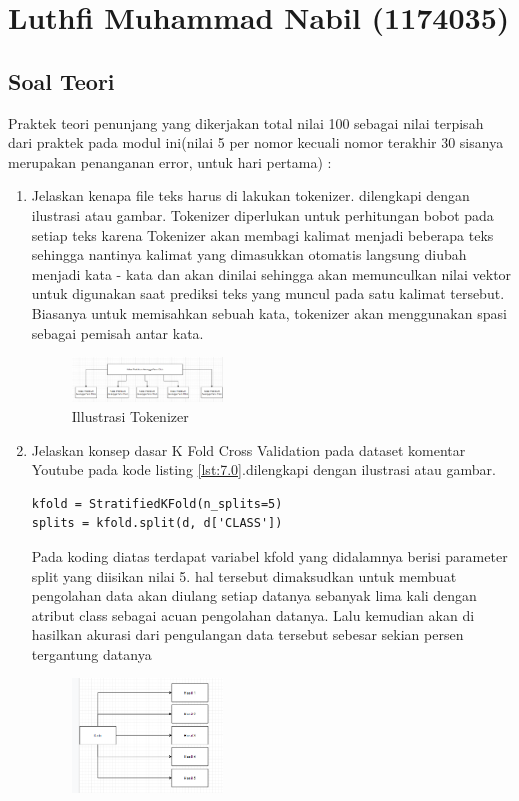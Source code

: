 \section{Luthfi Muhammad Nabil (1174035)}

\subsection{Soal Teori}
Praktek teori penunjang yang dikerjakan total nilai 100 sebagai nilai terpisah dari praktek pada modul ini(nilai 5 per nomor kecuali nomor terakhir 30 sisanya merupakan penanganan error, untuk hari pertama) :
\begin{enumerate}
\item
Jelaskan kenapa file teks harus di lakukan tokenizer. dilengkapi dengan ilustrasi atau gambar. \hfill \break
Tokenizer diperlukan untuk perhitungan bobot pada setiap teks karena Tokenizer akan membagi kalimat menjadi beberapa teks sehingga nantinya kalimat yang dimasukkan otomatis langsung diubah menjadi kata - kata dan akan dinilai sehingga akan memunculkan nilai vektor untuk digunakan saat prediksi teks yang muncul pada satu kalimat tersebut. Biasanya untuk memisahkan sebuah kata, tokenizer akan menggunakan spasi sebagai pemisah antar kata.
\begin{figure}[H]
    \includegraphics[width=4cm]{figures/1174035/chapter7/teori_1.png}
    \centering
    \caption{Illustrasi Tokenizer}
\end{figure}
\item
Jelaskan konsep dasar K Fold Cross Validation pada dataset komentar Youtube pada kode listing \ref{lst:7.0}.dilengkapi dengan ilustrasi atau gambar.
\begin{lstlisting}[caption=K Fold Cross Validation,label={lst:7.0}]
kfold = StratifiedKFold(n_splits=5)
splits = kfold.split(d, d['CLASS'])
\end{lstlisting}
Pada koding diatas terdapat variabel kfold yang didalamnya berisi parameter split yang diisikan nilai 5. hal tersebut dimaksudkan untuk membuat pengolahan data akan diulang setiap datanya sebanyak lima kali dengan atribut class sebagai acuan pengolahan datanya. Lalu kemudian akan di hasilkan akurasi dari pengulangan data tersebut sebesar sekian persen tergantung datanya
\begin{figure}[H]
    \includegraphics[width=4cm]{figures/1174035/chapter7/teori_2.png}

\end{figure}
\end{enumerate}
